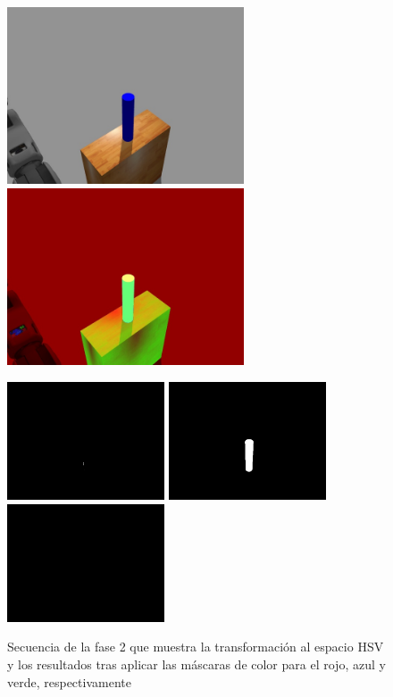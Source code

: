 \documentclass[12pt,spanish,chapterprefix, numbers=noenddot]{book}
\numberwithin{equation}{section}
\numberwithin{figure}{section}
\begin{document}
\begin{figure}[hbt!]
\centering
\includegraphics[width=7cm]{Figs/fase2_1.jpeg}
\includegraphics[width=7cm]{Figs/fase2_2.jpeg}
\par
\centering
\includegraphics[width=4.66cm]{Figs/red_mask.jpeg}
\includegraphics[width=4.66cm]{Figs/blue_mask.jpeg}
\includegraphics[width=4.66cm]{Figs/green_mask.jpeg}
\par
\caption{\label{fig:fase2}Secuencia de la fase 2 que muestra la transformación al espacio HSV y los resultados tras aplicar las máscaras de color para el rojo, azul y verde, respectivamente}
\end{figure}
\end{document}
